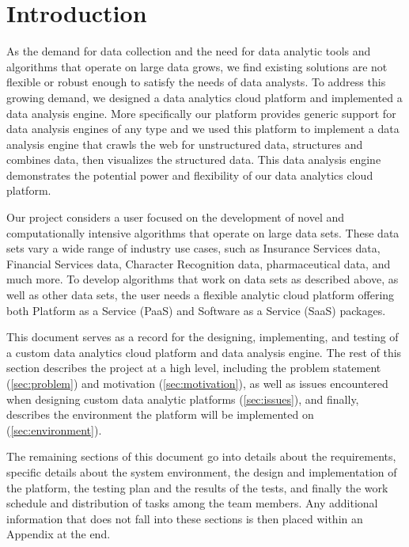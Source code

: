 \section{Introduction}
\label{sec:intro}

As the demand for data collection and the need for data analytic tools
and algorithms that operate on large data grows, we find existing solutions
are not flexible or robust enough to satisfy the needs of data analysts. 
To address this growing demand, we designed a data analytics cloud platform
and implemented a data analysis engine. More specifically our platform provides
generic support for data analysis engines of any type and we used this
platform to implement a data analysis engine that crawls the web for
unstructured data, structures and combines data, then visualizes the
structured data. This data analysis engine demonstrates the potential
power and flexibility of our data analytics cloud platform.

Our project considers a user focused on the development of novel and
computationally intensive algorithms that operate on large data sets.
These data sets vary a wide range of industry use cases, such as Insurance
Services data, Financial Services data, Character Recognition data, 
pharmaceutical data, and much more. To develop algorithms that work on data
sets as described above, as well as other data sets, the user needs a
flexible analytic cloud platform offering both Platform as a Service
(PaaS) and Software as a Service (SaaS) packages.

This document serves as a record for the designing, implementing, and
testing of a custom data analytics cloud platform and data analysis engine. 
The rest of this section describes the project at a high level,
including the problem statement (\ref{sec:problem}) and motivation
(\ref{sec:motivation}), as well as issues encountered when designing
custom data analytic platforms (\ref{sec:issues}), and finally, describes
the environment the platform will be implemented on
(\ref{sec:environment}).

The remaining sections of this document go into details about the
requirements, specific details about the system environment, the design and
implementation of the platform, the testing plan and the results of the
tests, and finally the work schedule and distribution of tasks among the
team members. Any additional information that does not fall into these
sections is then placed within an Appendix at the end.





